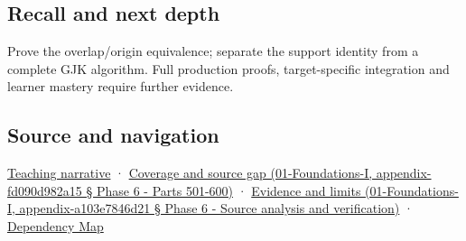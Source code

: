\subsection{Recall and next depth}\label{recall-and-next-depth}

Prove the overlap/origin equivalence; separate the support identity from a complete GJK algorithm. Full production proofs, target-specific integration and learner mastery require further evidence.

\subsection{Source and navigation}\label{source-and-navigation}

\href{Continuous\%20Notes/Computing\%20Foundations\%20-\%20From\%20Bits\%20to\%20C++\%20and\%20Systems\%20APIs\#Weighted\%20points\%20lead\%20from\%20affine\%20geometry\%20to\%20collision\%20shapes}{Teaching narrative} · \href{}{Coverage and source gap (01-Foundations-I, appendix-fd090d982a15 § Phase 6 - Parts 501-600)} · \href{}{Evidence and limits (01-Foundations-I, appendix-a103e7846d21 § Phase 6 - Source analysis and verification)} · \hyperref[appendix-4ad47bdd269a]{Dependency Map}

